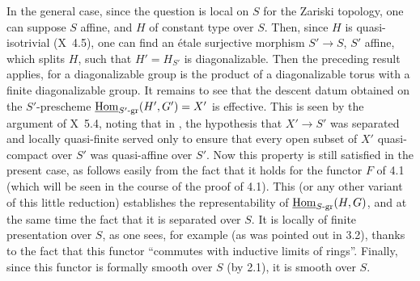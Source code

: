 In the general case, since the question is local on $S$ for the Zariski topology, one can suppose $S$ affine, and $H$ of constant type over $S$. Then, since $H$ is quasi-isotrivial (X~4.5), one can find an étale surjective morphism $S'\to S$, $S'$ affine, which splits $H$, \ie such that $H'=H_{S'}$ is diagonalizable. Then the preceding result applies, for a diagonalizable group is the product of a diagonalizable torus with a finite diagonalizable group. It remains to see that the descent datum obtained on the $S'$-prescheme $\underline{\operatorname{Hom}}_{S'\text{-gr}}(H',G')=X'$ is effective. This is seen by the argument of X~5.4, noting that in \loccit, the hypothesis that $X'\to S'$ was separated and locally quasi-finite served only to ensure that every open subset of $X'$ quasi-compact over $S'$ was quasi-affine over $S'$. Now this property is still satisfied in the present case, as follows easily from the fact that it holds for the functor $F$ of 4.1 (which will be seen in the course of the proof of 4.1). This (or any other variant of this little reduction) establishes the representability of $\underline{\operatorname{Hom}}_{S\text{-gr}}(H,G)$, and at the same time the fact that it is separated over $S$. It is locally of finite presentation over $S$, as one sees, for example (as was pointed out in 3.2), thanks to the fact that this functor ``commutes with inductive limits of rings''. Finally, since this functor is formally smooth over $S$ (by 2.1), it is smooth over $S$.

